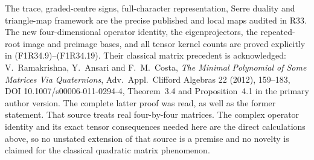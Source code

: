 The trace, graded-centre signs,
full-character representation,
Serre duality and triangle-map
framework are the precise published
and local maps audited in R33.
The new four-dimensional operator
identity, the eigenprojectors,
the repeated-root image and
preimage bases, and all tensor
kernel counts are proved explicitly
in (F1R34.9)--(F1R34.19).
Their classical matrix precedent
is acknowledged: V.~Ramakrishna,
Y.~Ansari and F.~M.~Costa,
\emph{The Minimal Polynomial of
Some Matrices Via Quaternions},
Adv.~Appl.~Clifford Algebras 22
(2012), 159--183,
DOI 10.1007/s00006-011-0294-4,
Theorem~3.4 and Proposition~4.1
in the primary author version.
The complete latter proof was
read, as well as the former
statement. That source treats
real four-by-four matrices.
The complex operator identity
and its exact tensor consequences
needed here are the direct
calculations above, so no unstated
extension of that source is a
premise and no novelty is claimed
for the classical quadratic
matrix phenomenon.

